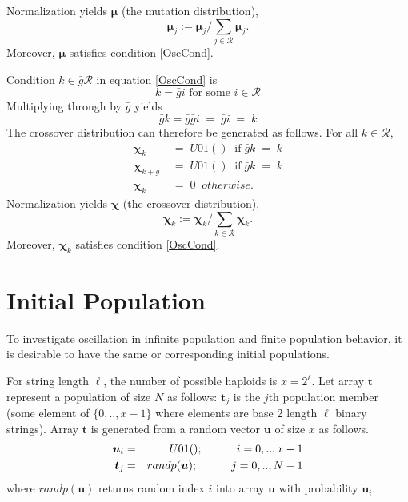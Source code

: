 Normalization yields $\bm{\mu}$ (the mutation distribution),
\[
\bm{\mu}_j := \bm{\mu}_j / \sum \limits_{j \in \mathcal{R} } \bm{\mu}_j.
\]
Moreover, $\bm{\mu}$ satisfies condition \ref{OscCond}.

Condition $k \in \bar{g} \mathcal{R}$ in equation \ref{OscCond} is
\[
k = \bar{g} i  \text{ for some $i \in \mathcal{R}$}
\]
Multiplying through by $\bar{g}$ yields
\begin{equation*}
\bar{g} k = \bar{g} \bar{g} i \; = \; \bar{g} i \; = \; k 
\end{equation*}
The crossover distribution can therefore be generated as follows.
For all $k \in \mathcal{R}$,
\begin{equation}
\label{ChiDist}
\begin{split}
\bm{\chi}_k & \;=\;  U01() \;\; \mbox{if}\; \bar{g}k \;=\; k \\
\bm{\chi}_{k+g} & \;=\;  U01() \;\; \mbox{if}\; \bar{g}k \;=\; k\\
\bm{\chi}_k & \;=\;  0  \;\; otherwise.
\end{split}
\end{equation} 
Normalization yields 
$\bm{\chi}$ (the crossover distribution),
\[
\bm{\chi}_k := \bm{\chi}_k/\sum\limits_{k \in \mathcal{R}} \bm{\chi}_k.
\]
Moreover, $\bm{\chi}_k$ satisfies condition \ref{OscCond}.

\section{Initial Population}
\label{InitPopOsc}

To investigate oscillation in infinite population and finite population behavior, 
it is desirable to have the same or corresponding initial populations. 

For string length $\ell$, the number of possible haploids is $x = 2^\ell$. Let array $\bm{t}$ represent a  
population of size $N$ as follows: $\bm{t}_j$ is the $j$th population member (some element of $\{0,..,x-1\}$ 
where elements are base 2 length $\ell$ binary strings). Array $\bm{t}$ is generated from a random vector $\bm{u}$ of size $x$ as follows. 
\begin{eqnarray*}
\bm{u}_i & = & U01(); \hspace{30pt} {i = 0,.., x-1} \\
\bm{t}_j & = & randp(\bm{u}) ; \hspace{30pt} {j = 0,.., N-1}
\end{eqnarray*}
where $randp(\bm{u})$ returns random index $i$ into array $\bm{u}$ with probability $\bm{u}_i$.

